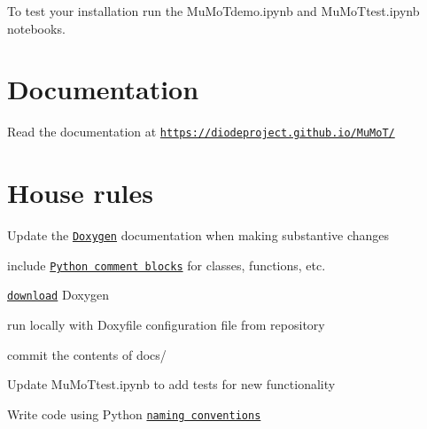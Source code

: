 To test your installation run the {\ttfamily Mu\+Mo\+Tdemo.\+ipynb} and {\ttfamily Mu\+Mo\+Ttest.\+ipynb} notebooks.

\section*{Documentation}

Read the documentation at \href{https://diodeproject.github.io/MuMoT/}{\tt https\+://diodeproject.\+github.\+io/\+Mu\+Mo\+T/}

\section*{House rules}


\begin{DoxyItemize}
\item Update the \href{http://www.stack.nl/~dimitri/doxygen/index.html}{\tt Doxygen} documentation when making substantive changes
\begin{DoxyItemize}
\item include \href{http://www.stack.nl/~dimitri/doxygen/manual/docblocks.html#pythonblocks}{\tt Python comment blocks} for classes, functions, etc.
\item \href{http://www.stack.nl/~dimitri/doxygen/download.html}{\tt download} Doxygen
\item run locally with {\ttfamily Doxyfile} configuration file from repository
\item commit the contents of {\ttfamily docs/}
\end{DoxyItemize}
\item Update {\ttfamily Mu\+Mo\+Ttest.\+ipynb} to add tests for new functionality
\item Write code using Python \href{https://www.python.org/dev/peps/pep-0008/#naming-conventions}{\tt naming conventions} 
\end{DoxyItemize}